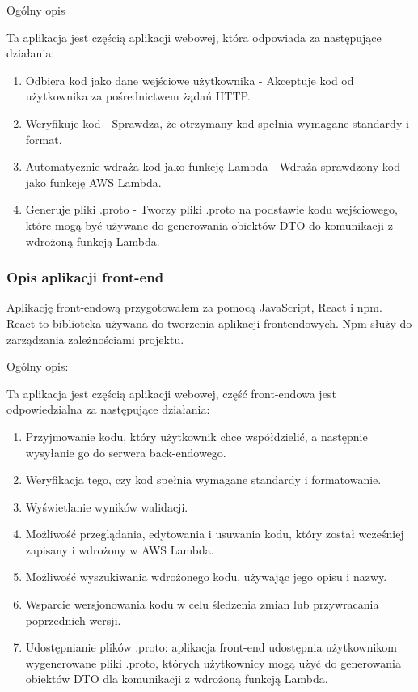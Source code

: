 \documentclass[runningheads,12pt]{llncs}
\begin{document}
Ogólny opis

Ta aplikacja jest częścią aplikacji webowej, która odpowiada za następujące działania:
\begin{enumerate}
    \item Odbiera kod jako dane wejściowe użytkownika - Akceptuje kod od użytkownika za pośrednictwem żądań HTTP.
    \item Weryfikuje kod - Sprawdza, że otrzymany kod spełnia wymagane standardy i format.
    \item Automatycznie wdraża kod jako funkcję Lambda -  Wdraża sprawdzony kod jako funkcję AWS Lambda.
    \item Generuje pliki .proto - Tworzy pliki .proto na podstawie kodu wejściowego, które mogą być używane do generowania obiektów DTO do komunikacji z wdrożoną funkcją Lambda.
\end{enumerate}


\subsubsection{Opis aplikacji front-end}

Aplikację front-endową przygotowałem za pomocą JavaScript, React i npm.
React to biblioteka używana do tworzenia aplikacji frontendowych.  
Npm służy do zarządzania zależnościami projektu.

Ogólny opis:

Ta aplikacja jest częścią aplikacji webowej, część front-endowa jest odpowiedzialna za następujące działania:
\begin{enumerate}
    \item Przyjmowanie kodu, który użytkownik chce współdzielić, a następnie wysyłanie go do serwera back-endowego.
    \item Weryfikacja tego, czy kod spełnia wymagane standardy i formatowanie.
    \item Wyświetlanie wyników walidacji.
    \item Możliwość przeglądania, edytowania i usuwania kodu, który został wcześniej zapisany i wdrożony w AWS Lambda.
    \item Możliwość wyszukiwania wdrożonego kodu, używając jego opisu i nazwy.
    \item Wsparcie wersjonowania kodu w celu śledzenia zmian lub przywracania poprzednich wersji.
    \item Udostępnianie plików .proto: aplikacja front-end udostępnia użytkownikom wygenerowane pliki .proto, których użytkownicy mogą użyć do generowania obiektów DTO dla komunikacji z wdrożoną funkcją Lambda.
\end{enumerate}
\end{document}
